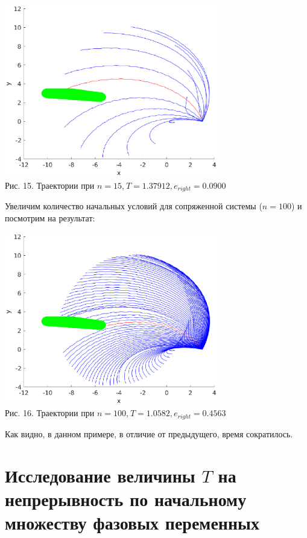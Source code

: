 \documentclass[11pt]{article}
\begin{document}
\begin{center}
	\includegraphics[width=0.7\textwidth]{pic_ulc_1.eps}\\
	{Рис. 15. Траектории при $n = 15$,$ \ T = 1.37912, e_{right} = 0.0900$}
\end{center}
{Увеличим количество начальных условий для сопряженной системы ($ n = 100$) и посмотрим на результат:}
\begin{center}
	\includegraphics[width=0.7\textwidth]{pic_ulc_2.eps}\\
	{Рис. 16. Траектории при $n = 100$,$ \ T = 1.0582,e_{right} = 0.4563$}
\end{center}
{Как видно, в данном примере, в отличие от предыдущего, время сократилось.}
\newpage
{\vspace*{-3cm}\section{Исследование величины $T$ на непрерывность по начальному множеству фазовых переменных} }
\end{document}
